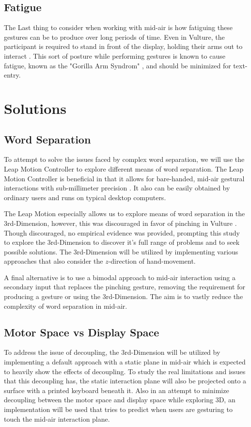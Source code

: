 \subsection{Fatigue}
The Last thing to consider when working with mid-air is how fatiguing these gestures can be to produce over long periods of time. Even in Vulture, the participant is required to stand in front of the display, holding their arms out to interact \cite{ref_vulture}. This sort of posture while performing gestures is known to cause fatigue, known as the "Gorilla Arm Syndrom" \cite{ref_gorilla_arm,ref_fatigue_limitation}, and should be minimized for text-entry.

\section{Solutions}

\subsection{Word Separation}
To attempt to solve the issues faced by complex word separation, we will use the Leap Motion Controller to explore different means of word separation. The Leap Motion Controller is beneficial in that it allows for bare-handed, mid-air gestural interactions with sub-millimeter precision \cite{ref_leap_device_evaluation_1,ref_leap_device_evaluation_2}. It also can be easily obtained by ordinary users and runs on typical desktop computers.

The Leap Motion especially allows us to explore means of word separation in the 3rd-Dimension, however, this was discouraged in favor of pinching in Vulture \cite{ref_vulture}. Though discouraged, no empirical evidence was provided, prompting this study to explore the 3rd-Dimension to discover it's full range of problems and to seek possible solutions. The 3rd-Dimension will be utilized by implementing various approaches that also consider the $z$-direction of hand-movement.

A final alternative is to use a bimodal approach to mid-air interaction using a secondary input that replaces the pinching gesture, removing the requirement for producing a gesture or using the 3rd-Dimension. The aim is to vastly reduce the complexity of word separation in mid-air.

\subsection{Motor Space vs Display Space}
To address the issue of decoupling, the 3rd-Dimension will be utilized by implementing a default approach with a static plane in mid-air which is expected to heavily show the effects of decoupling. To study the real limitations and issues that this decoupling has, the static interaction plane will also be projected onto a surface with a printed keyboard beneath it. Also in an attempt to minimize decoupling between the motor space and display space while exploring 3D, an implementation will be used that tries to predict when users are gesturing to touch the mid-air interaction plane.

